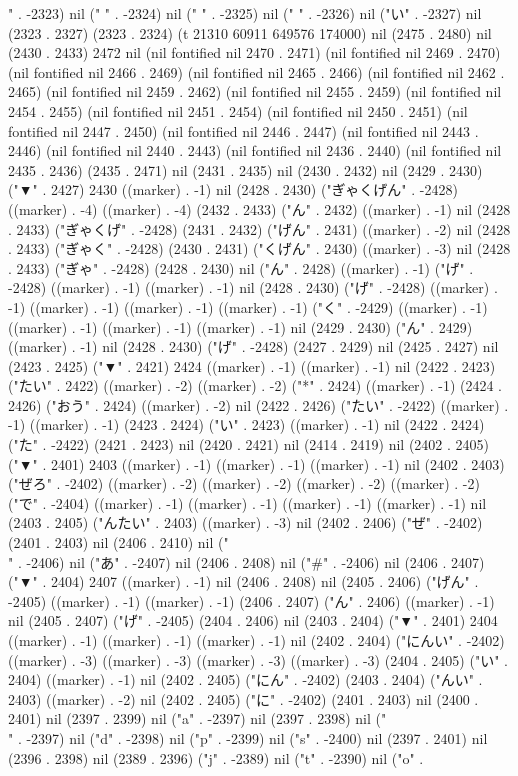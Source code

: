 {" . -2323) nil (" " . -2324) nil (" " . -2325) nil (" " . -2326) nil ("い" . -2327) nil (2323 . 2327) (2323 . 2324) (t 21310 60911 649576 174000) nil (2475 . 2480) nil (2430 . 2433) 2472 nil (nil fontified nil 2470 . 2471) (nil fontified nil 2469 . 2470) (nil fontified nil 2466 . 2469) (nil fontified nil 2465 . 2466) (nil fontified nil 2462 . 2465) (nil fontified nil 2459 . 2462) (nil fontified nil 2455 . 2459) (nil fontified nil 2454 . 2455) (nil fontified nil 2451 . 2454) (nil fontified nil 2450 . 2451) (nil fontified nil 2447 . 2450) (nil fontified nil 2446 . 2447) (nil fontified nil 2443 . 2446) (nil fontified nil 2440 . 2443) (nil fontified nil 2436 . 2440) (nil fontified nil 2435 . 2436) (2435 . 2471) nil (2431 . 2435) nil (2430 . 2432) nil (2429 . 2430) ("▼" . 2427) 2430 ((marker) . -1) nil (2428 . 2430) ("ぎゃくげん" . -2428) ((marker) . -4) ((marker) . -4) (2432 . 2433) ("ん" . 2432) ((marker) . -1) nil (2428 . 2433) ("ぎゃくげ" . -2428) (2431 . 2432) ("げん" . 2431) ((marker) . -2) nil (2428 . 2433) ("ぎゃく" . -2428) (2430 . 2431) ("くげん" . 2430) ((marker) . -3) nil (2428 . 2433) ("ぎゃ" . -2428) (2428 . 2430) nil ("ん" . 2428) ((marker) . -1) ("げ" . -2428) ((marker) . -1) ((marker) . -1) nil (2428 . 2430) ("げ" . -2428) ((marker) . -1) ((marker) . -1) ((marker) . -1) ((marker) . -1) ("く" . -2429) ((marker) . -1) ((marker) . -1) ((marker) . -1) ((marker) . -1) nil (2429 . 2430) ("ん" . 2429) ((marker) . -1) nil (2428 . 2430) ("げ" . -2428) (2427 . 2429) nil (2425 . 2427) nil (2423 . 2425) ("▼" . 2421) 2424 ((marker) . -1) ((marker) . -1) nil (2422 . 2423) ("たい" . 2422) ((marker) . -2) ((marker) . -2) ("*" . 2424) ((marker) . -1) (2424 . 2426) ("おう" . 2424) ((marker) . -2) nil (2422 . 2426) ("たい" . -2422) ((marker) . -1) ((marker) . -1) (2423 . 2424) ("い" . 2423) ((marker) . -1) nil (2422 . 2424) ("た" . -2422) (2421 . 2423) nil (2420 . 2421) nil (2414 . 2419) nil (2402 . 2405) ("▼" . 2401) 2403 ((marker) . -1) ((marker) . -1) ((marker) . -1) nil (2402 . 2403) ("ぜろ" . -2402) ((marker) . -2) ((marker) . -2) ((marker) . -2) ((marker) . -2) ("で" . -2404) ((marker) . -1) ((marker) . -1) ((marker) . -1) ((marker) . -1) nil (2403 . 2405) ("んたい" . 2403) ((marker) . -3) nil (2402 . 2406) ("ぜ" . -2402) (2401 . 2403) nil (2406 . 2410) nil ("\\" . -2406) nil ("あ" . -2407) nil (2406 . 2408) nil ("#" . -2406) nil (2406 . 2407) ("▼" . 2404) 2407 ((marker) . -1) nil (2406 . 2408) nil (2405 . 2406) ("げん" . -2405) ((marker) . -1) ((marker) . -1) (2406 . 2407) ("ん" . 2406) ((marker) . -1) nil (2405 . 2407) ("げ" . -2405) (2404 . 2406) nil (2403 . 2404) ("▼" . 2401) 2404 ((marker) . -1) ((marker) . -1) ((marker) . -1) nil (2402 . 2404) ("にんい" . -2402) ((marker) . -3) ((marker) . -3) ((marker) . -3) ((marker) . -3) (2404 . 2405) ("い" . 2404) ((marker) . -1) nil (2402 . 2405) ("にん" . -2402) (2403 . 2404) ("んい" . 2403) ((marker) . -2) nil (2402 . 2405) ("に" . -2402) (2401 . 2403) nil (2400 . 2401) nil (2397 . 2399) nil ("a" . -2397) nil (2397 . 2398) nil ("\\" . -2397) nil ("d" . -2398) nil ("p" . -2399) nil ("s" . -2400) nil (2397 . 2401) nil (2396 . 2398) nil (2389 . 2396) ("j" . -2389) nil ("t" . -2390) nil ("o" . }
